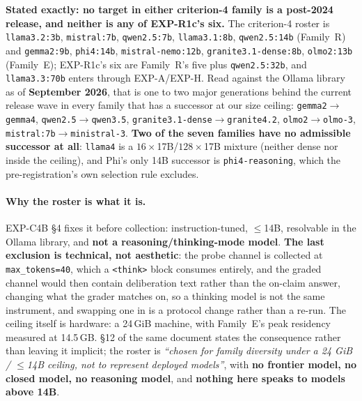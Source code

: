 \textbf{Stated exactly: no target in either criterion-4 family is a post-2024 release, and neither is any of EXP-R1c's six.} The criterion-4 roster is \texttt{llama3.2:3b}, \texttt{mistral:7b}, \texttt{qwen2.5:7b}, \texttt{llama3.1:8b}, \texttt{qwen2.5:14b} (Family~R) and \texttt{gemma2:9b}, \texttt{phi4:14b}, \texttt{mistral-nemo:12b}, \texttt{granite3.1-dense:8b}, \texttt{olmo2:13b} (Family~E); EXP-R1c's six are Family~R's five plus \texttt{qwen2.5:32b}, and \texttt{llama3.3:70b} enters through EXP-A/EXP-H. Read against the Ollama library as of \textbf{September 2026}, that is one to two major generations behind the current release wave in every family that has a successor at our size ceiling: \texttt{gemma2}$\to$\texttt{gemma4}, \texttt{qwen2.5}$\to$\texttt{qwen3.5}, \texttt{granite3.1-dense}$\to$\texttt{granite4.2}, \texttt{olmo2}$\to$\texttt{olmo-3}, \texttt{mistral:7b}$\to$\texttt{ministral-3}. \textbf{Two of the seven families have no admissible successor at all}: \texttt{llama4} is a $16\times$17B/$128\times$17B mixture (neither dense nor inside the ceiling), and Phi's only 14B successor is \texttt{phi4-reasoning}, which the pre-registration's own selection rule excludes.

\paragraph{Why the roster is what it is.} EXP-C4B §4 fixes it before collection: instruction-tuned, $\leq$14B, resolvable in the Ollama library, and \textbf{not a reasoning/thinking-mode model}. \textbf{The last exclusion is technical, not aesthetic}: the probe channel is collected at \texttt{max\_tokens=40}, which a \texttt{<think>} block consumes entirely, and the graded channel would then contain deliberation text rather than the on-claim answer, changing what the grader matches on, so a thinking model is not the same instrument, and swapping one in is a protocol change rather than a re-run. The ceiling itself is hardware: a 24\,GiB machine, with Family~E's peak residency measured at 14.5\,GB. §12 of the same document states the consequence rather than leaving it implicit; the roster is \emph{``chosen for family diversity under a 24 GiB / $\leq$14B ceiling, not to represent deployed models''}, with \textbf{no frontier model, no closed model, no reasoning model}, and \textbf{nothing here speaks to models above 14B}.

